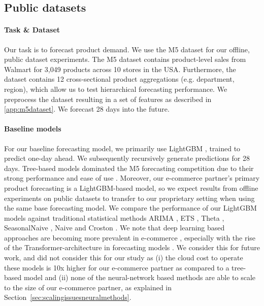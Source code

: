 \documentclass[preprint, 3p, times, twocolumn]{elsarticle}
\begin{document}
  \subsection{Public datasets} \label{subsec:publicdatasets}
  \paragraph{Task \& Dataset} Our task is to forecast product demand. We use the M5 dataset \cite{makridakis_m5_2021} for our offline, public dataset experiments. The M5 dataset contains product-level sales from Walmart for 3,049 products across 10 stores in the USA. Furthermore, the dataset contains 12 cross-sectional product aggregations (e.g. department, region), which allow us to test hierarchical forecasting performance. We preprocess the dataset resulting in a set of features as described in \ref{app:m5dataset}. We forecast 28 days into the future.
  
  \paragraph{Baseline models} For our baseline forecasting model, we primarily use LightGBM \cite{ke_lightgbm_2017}, trained to predict one-day ahead. We subsequently recursively generate predictions for 28 days. Tree-based models dominated the M5 forecasting competition due to their strong performance and ease of use \cite{makridakis_m5_2022,januschowski_forecasting_2022}. Moreover, our e-commerce partner's primary product forecasting is a LightGBM-based model, so we expect results from offline experiments on public datasets to transfer to our proprietary setting when using the same base forecasting model. We compare the performance of our LightGBM models against traditional statistical methods ARIMA \cite{box_distribution_1970}, ETS \cite{hyndman_forecasting_2008}, Theta \cite{assimakopoulos_theta_2000}, SeasonalNaive \cite{hyndman_forecasting_2021}, Naive \cite{hyndman_forecasting_2021} and Croston \cite{croston_forecasting_1972}. 
  We note that deep learning based approaches are becoming more prevalent in e-commerce \cite{kunz_deep_2023}, especially with the rise of the Transformer-architecture in forecasting models \cite{lim_temporal_2021,li_enhancing_2019}. We consider this for future work, and did not consider this for our study as (i) the cloud cost to operate these models is 10x higher for our e-commerce partner as compared to a tree-based model and (ii) none of the neural-network based methods are able to scale to the size of our e-commerce partner, as explained in Section~\ref{sec:scalingissuesneuralmethods}. 
\end{document}
